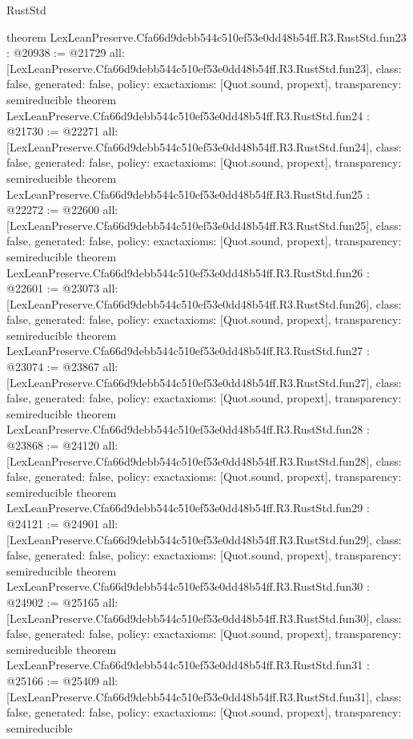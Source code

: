 \begin{lexlean}{RustStd}
\begin{coremodule}
{}
theorem LexLeanPreserve.Cfa66d9debb544c510ef53e0dd48b54ff.R3.RustStd.fun23 : @20938 := @21729 {
  all: [LexLeanPreserve.Cfa66d9debb544c510ef53e0dd48b54ff.R3.RustStd.fun23],
  class: false,
  generated: false,
  policy: exact{axioms: [Quot.sound, propext]},
  transparency: semireducible
}
theorem LexLeanPreserve.Cfa66d9debb544c510ef53e0dd48b54ff.R3.RustStd.fun24 : @21730 := @22271 {
  all: [LexLeanPreserve.Cfa66d9debb544c510ef53e0dd48b54ff.R3.RustStd.fun24],
  class: false,
  generated: false,
  policy: exact{axioms: [Quot.sound, propext]},
  transparency: semireducible
}
theorem LexLeanPreserve.Cfa66d9debb544c510ef53e0dd48b54ff.R3.RustStd.fun25 : @22272 := @22600 {
  all: [LexLeanPreserve.Cfa66d9debb544c510ef53e0dd48b54ff.R3.RustStd.fun25],
  class: false,
  generated: false,
  policy: exact{axioms: [Quot.sound, propext]},
  transparency: semireducible
}
theorem LexLeanPreserve.Cfa66d9debb544c510ef53e0dd48b54ff.R3.RustStd.fun26 : @22601 := @23073 {
  all: [LexLeanPreserve.Cfa66d9debb544c510ef53e0dd48b54ff.R3.RustStd.fun26],
  class: false,
  generated: false,
  policy: exact{axioms: [Quot.sound, propext]},
  transparency: semireducible
}
theorem LexLeanPreserve.Cfa66d9debb544c510ef53e0dd48b54ff.R3.RustStd.fun27 : @23074 := @23867 {
  all: [LexLeanPreserve.Cfa66d9debb544c510ef53e0dd48b54ff.R3.RustStd.fun27],
  class: false,
  generated: false,
  policy: exact{axioms: [Quot.sound, propext]},
  transparency: semireducible
}
theorem LexLeanPreserve.Cfa66d9debb544c510ef53e0dd48b54ff.R3.RustStd.fun28 : @23868 := @24120 {
  all: [LexLeanPreserve.Cfa66d9debb544c510ef53e0dd48b54ff.R3.RustStd.fun28],
  class: false,
  generated: false,
  policy: exact{axioms: [Quot.sound, propext]},
  transparency: semireducible
}
theorem LexLeanPreserve.Cfa66d9debb544c510ef53e0dd48b54ff.R3.RustStd.fun29 : @24121 := @24901 {
  all: [LexLeanPreserve.Cfa66d9debb544c510ef53e0dd48b54ff.R3.RustStd.fun29],
  class: false,
  generated: false,
  policy: exact{axioms: [Quot.sound, propext]},
  transparency: semireducible
}
theorem LexLeanPreserve.Cfa66d9debb544c510ef53e0dd48b54ff.R3.RustStd.fun30 : @24902 := @25165 {
  all: [LexLeanPreserve.Cfa66d9debb544c510ef53e0dd48b54ff.R3.RustStd.fun30],
  class: false,
  generated: false,
  policy: exact{axioms: [Quot.sound, propext]},
  transparency: semireducible
}
theorem LexLeanPreserve.Cfa66d9debb544c510ef53e0dd48b54ff.R3.RustStd.fun31 : @25166 := @25409 {
  all: [LexLeanPreserve.Cfa66d9debb544c510ef53e0dd48b54ff.R3.RustStd.fun31],
  class: false,
  generated: false,
  policy: exact{axioms: [Quot.sound, propext]},
  transparency: semireducible
}
\end{coremodule}
\end{lexlean}
